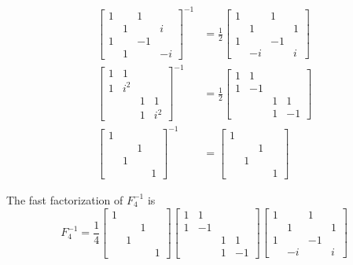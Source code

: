 \documentclass[a4paper]{article}
\begin{document}
\begin{align*}
	\begin{bmatrix}
		1 &  & 1 & \\
		 & 1 &  & i \\
		1 &  & -1 & \\
		 & 1 &  & -i
	\end{bmatrix}^{-1} & = \frac{1}{2}\begin{bmatrix}
		1 &  & 1 & \\
		 & 1 &  & 1 \\
		1 &  & -1 & \\
		 & -i &  & i
	\end{bmatrix} \\
	\begin{bmatrix}
		1 & 1 &  & \\
		1 & i^{2} &  & \\
		 &  & 1 & 1 \\
		 &  & 1 & i^{2}
	\end{bmatrix}^{-1} & = \frac{1}{2}\begin{bmatrix}
		1 & 1 &  & \\
		1 & -1 &  & \\
		 &  & 1 & 1 \\
		 &  & 1 & -1
	\end{bmatrix} \\
	\begin{bmatrix}
		1 &  &  & \\
		 &  & 1 & \\
		 & 1 &  & \\
		 &  &  & 1
	\end{bmatrix}^{-1} & = \begin{bmatrix}
		1 &  &  & \\
		 &  & 1 & \\
		 & 1 &  & \\
		 &  &  & 1
	\end{bmatrix}
\end{align*}

The fast factorization of \( F^{-1}_{4} \) is
\[
	F^{-1}_{4} = \frac{1}{4}\begin{bmatrix}
		1 &  &  & \\
		 &  & 1 & \\
		 & 1 &  & \\
		 &  &  & 1
	\end{bmatrix} 
	\begin{bmatrix}
		1 & 1 &  & \\
		1 & -1 &  & \\
		 &  & 1 & 1 \\
		 &  & 1 & -1
	\end{bmatrix}
	\begin{bmatrix}
		1 &  & 1 & \\
		 & 1 &  & 1 \\
		1 &  & -1 & \\
		 & -i &  & i
	\end{bmatrix}
\]
\end{document}
